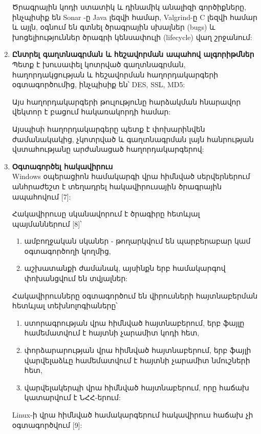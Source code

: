 \documentclass[a4paper,12pt]{article}
\begin{document}
\begin{sloppypar}
\begin{enumerate}
    Ծրագրային կոդի ստատիկ և դինամիկ անալիզի գործիքները, ինչպիսիք են
    Sonar -ը Java լեզվի համար, Valgrind-ը C լեզվի համար և այլն,
    օգնում են գտնել ծրագրային սխալներ (bugs) և խոցելիություններ ծրագրի
    կենսափուլի (lifecycle) վաղ շրջանում:
\item \textbf{Ընտրել գաղտնագրման և հեշավորման ապահով ալգորիթմներ}\\
    Պետք է խուսափել կոտրված գաղտնագրման, հաղորդակցության և
    հեշավորման հաղորդակարգերի օգտագործումից, ինչպիսիք են՝
	DES, SSL, MD5:

    Այս հաղորդակարգերի թուլությունը հարձակման հնարավոր
    վեկտոր է բացում հակառակորդի համար:

    Այսպիսի հաղորդակարգերը պետք է փոխարինվեն ժամանակակից,
    չկոտրված և գաղտնագրման լայն հանրության վստահությանը արժանացած
    հաղորդակարգերով:
\item \textbf{Օգտագործել հակավիրուս}\\
	Windows օպերացիոն համակարգի վրա հիմնված սերվերներում անհրաժեշտ է տեղադրել
	հակավիրուսային ծրագրային ապահովում [7]:

	Հակավիրուսը սկանավորում է ծրագիրը հետևյալ պայմաններում [8]՝
	\begin{enumerate}
		\item ամբողջական սկաներ - թողարկվում են պարբերաբար կամ օգտագործողի կողմից,
		\item աշխատանքի ժամանակ, այսինքն երբ համակարգով փոխանցվում են տվյալներ:
	\end{enumerate}

	Հակավիրուսները օգտագործում են վիրուսների հայտնաբերման հետևյալ տեխնոլոգիաները՝

	\begin{enumerate}
	\item ստորագրության վրա հիմնված հայտնաբերում, երբ ֆայլը համեմատվում է հայտնի չարամիտ կոդի հետ,
	\item փորձարարության վրա հիմնված հայտնաբերում, երբ ֆայլի վարվելաձևը համեմատվում է հայտնի չարամիտ նմուշների հետ,
	\item վարվելակերպի վրա հիմնված հայտնաբերում, որը հաճախ կատարվում է ՆՀՀ-երում:
	\end{enumerate}

	Linux-ի վրա հիմնված համակարգերում հակավիրուս հաճախ չի օգտագործվում [9]:


\end{enumerate}
\end{sloppypar}
\end{document}
